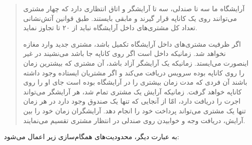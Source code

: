 \documentclass{book}
\begin{document}
\begin{quotation}
    آرایشگاه ما سه تا صندلی،‌ سه تا آرایشگر و اتاق انتظاری دارد که  چهار مشتری می‌توانند روی یک کاناپه قرار گیرند و مابقی بایستند. 
    طبق قوانین آتش‌نشانی تعداد کل مشتری‌های داخل آرایشگاه نباید از ۲۰ تا تجاوز نماید. 
    

    اگر ظرفیت مشتری‌های داخل آرایشگاه تکمیل باشد، مشتری جدید وارد مغازه نخواهد شد. 
    زمانیکه داخل است اگر روی کاناپه جا باشد می‌نشیند در غیر اینصورت می‌ایستد. 
    زمانیکه یک آرایشگر آزاد باشد، آن مشتری که بیشترین زمان را روی کاناپه بوده  سرویس دریافت می‌کند و اگر مشتریان ایستاده وجود داشته باشند 
    آن فردی که مدت زمان بیشتری را در آرایشگاه بوده است جای او را روی کاناپه خواهد گرفت. 
    زمانیکه آرایش یک مشتری تمام شد،‌ هر آرایشگر می‌تواند اجرت را دریافت دارد،‌ امّا از آنجایی که تنها یک صندوق وجود دارد
    در هر زمان تنها یک مشتری می‌تواند پرداخت خود را انجام دهد. آرایشگران زمان خود را بین آرایش، دریافت وجه و خوابیدن روی صندلی در انتظار مشتری 
    تقسیم می‌نمایند. 
\end{quotation}


    به عبارت دیگر، محدودیت‌های همگام‌سازی زیر اعمال می‌شود:
\end{document}
